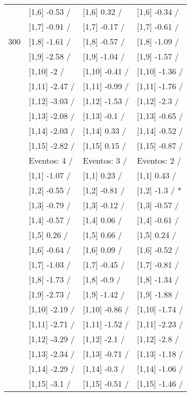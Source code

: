 \begin{table}
\begin{tabular}[t]{llll}
 & {}[1,6] -0.53  / & {}[1,6] 0.32  / & {}[1,6] -0.34  /\\
 & {}[1,7] -0.91  / & {}[1,7] -0.17  / & {}[1,7] -0.61  /\\
300 & {}[1,8] -1.61  / & {}[1,8] -0.57  / & {}[1,8] -1.09  /\\
\addlinespace
 & {}[1,9] -2.58  / & {}[1,9] -1.04  / & {}[1,9] -1.57  /\\
 & {}[1,10] -2  / & {}[1,10] -0.41  / & {}[1,10] -1.36  /\\
 & {}[1,11] -2.47  / & {}[1,11] -0.99  / & {}[1,11] -1.76  /\\
 & {}[1,12] -3.03  / & {}[1,12] -1.53  / & {}[1,12] -2.3  /\\
 & {}[1,13] -2.08  / & {}[1,13] -0.1  / & {}[1,13] -0.65  /\\
\addlinespace
 & {}[1,14] -2.03  / & {}[1,14] 0.33  / & {}[1,14] -0.52  /\\
 & {}[1,15] -2.82  / & {}[1,15] 0.15  / & {}[1,15] -0.87  /\\
 & Eventos:  4 / & Eventos:  3 / & Eventos:  2 /\\
 & {}[1,1] -1.07  / & {}[1,1] 0.23  / & {}[1,1] 0.43  /\\
 & {}[1,2] -0.55  / & {}[1,2] -0.81  / & {}[1,2] -1.3  / *\\
\addlinespace
 & {}[1,3] -0.79  / & {}[1,3] -0.12  / & {}[1,3] -0.57  /\\
 & {}[1,4] -0.57  / & {}[1,4] 0.06  / & {}[1,4] -0.61  /\\
 & {}[1,5] 0.26  / & {}[1,5] 0.66  / & {}[1,5] 0.24  /\\
 & {}[1,6] -0.64  / & {}[1,6] 0.09  / & {}[1,6] -0.52  /\\
 & {}[1,7] -1.03  / & {}[1,7] -0.45  / & {}[1,7] -0.81  /\\
\addlinespace
500 & {}[1,8] -1.73  / & {}[1,8] -0.9  / & {}[1,8] -1.34  /\\
 & {}[1,9] -2.73  / & {}[1,9] -1.42  / & {}[1,9] -1.88  /\\
 & {}[1,10] -2.19  / & {}[1,10] -0.86  / & {}[1,10] -1.74  /\\
 & {}[1,11] -2.71  / & {}[1,11] -1.52  / & {}[1,11] -2.23  /\\
 & {}[1,12] -3.29  / & {}[1,12] -2.1  / & {}[1,12] -2.8  /\\
\addlinespace
 & {}[1,13] -2.34  / & {}[1,13] -0.71  / & {}[1,13] -1.18  /\\
 & {}[1,14] -2.29  / & {}[1,14] -0.3  / & {}[1,14] -1.06  /\\
 & {}[1,15] -3.1  / & {}[1,15] -0.51  / & {}[1,15] -1.46  /\\
\bottomrule
\end{tabular}
\end{table}
